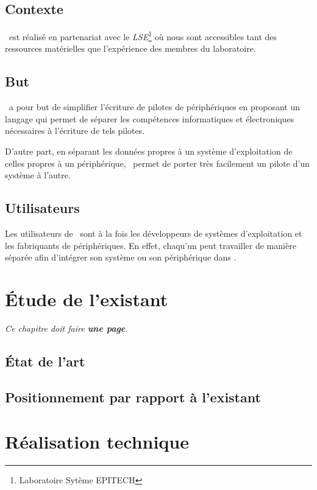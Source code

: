 \documentclass[francais]{rtxreport}
\begin{document}
\section{Contexte}
\rtx\ est réalisé en partenariat avec le \emph{LSE}\footnote{Laboratoire Sytème
EPITECH} où nous sont accessibles tant des ressources matérielles que
l'expérience des membres du laboratoire.

\section{But}
\rtx\ a pour but de simplifier l'écriture de pilotes de périphériques en
proposant un langage qui permet de séparer les compétences informatiques et
électroniques nécessaires à l'écriture de tels pilotes.

D'autre part, en séparant les données propres à un système d'exploitation de
celles propres à un périphérique, \rtx\ permet de porter très facilement un
pilote d'un système à l'autre.

\section{Utilisateurs}
Les utilisateurs de \rtx\ sont à la fois les développeurs de systèmes
d'exploitation et les fabriquants de périphériques. En effet, chaqu'un peut
travailler de manière séparée afin d'intégrer son système ou son périphérique
dans \rtx.

\chapter{Étude de l'existant}

\emph{Ce chapitre doit faire \textbf{une page}.}

\section{État de l'art}

\section{Positionnement par rapport à l'existant}


\chapter{Réalisation technique}
\end{document}
